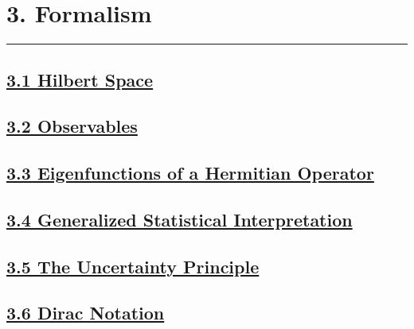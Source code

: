 \section{3. Formalism} \hrule height 0.3pt \thinspace

\subsection{\underline{3.1 Hilbert Space}}

\subsection{\underline{3.2 Observables}}

\subsection{\underline{3.3 Eigenfunctions of a Hermitian Operator}}

\subsection{\underline{3.4 Generalized Statistical Interpretation}}

\subsection{\underline{3.5 The Uncertainty Principle}}

\subsection{\underline{3.6 Dirac Notation}}
